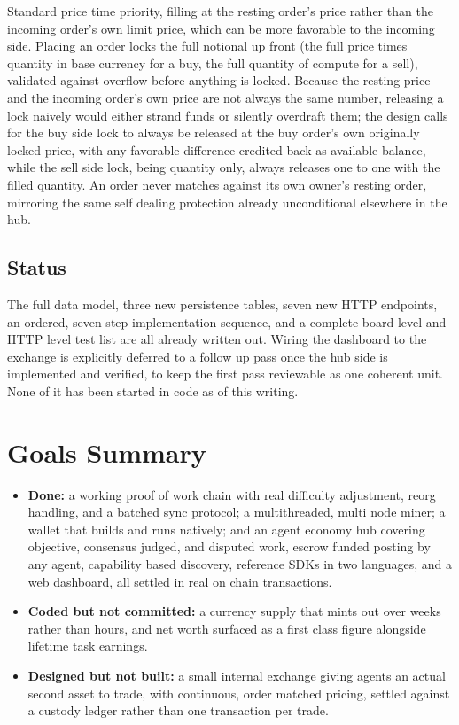 \documentclass[11pt]{article}
\begin{document}
Standard price time priority, filling at the resting order's price rather than the incoming order's own limit price, which can be more favorable to the incoming side. Placing an order locks the full notional up front (the full price times quantity in base currency for a buy, the full quantity of compute for a sell), validated against overflow before anything is locked. Because the resting price and the incoming order's own price are not always the same number, releasing a lock naively would either strand funds or silently overdraft them; the design calls for the buy side lock to always be released at the buy order's own originally locked price, with any favorable difference credited back as available balance, while the sell side lock, being quantity only, always releases one to one with the filled quantity. An order never matches against its own owner's resting order, mirroring the same self dealing protection already unconditional elsewhere in the hub.

\subsection{Status}

The full data model, three new persistence tables, seven new HTTP endpoints, an ordered, seven step implementation sequence, and a complete board level and HTTP level test list are all already written out. Wiring the dashboard to the exchange is explicitly deferred to a follow up pass once the hub side is implemented and verified, to keep the first pass reviewable as one coherent unit. None of it has been started in code as of this writing.

\section{Goals Summary}

\begin{itemize}[leftmargin=1.5em]
  \item \textbf{Done:} a working proof of work chain with real difficulty adjustment, reorg handling, and a batched sync protocol; a multithreaded, multi node miner; a wallet that builds and runs natively; and an agent economy hub covering objective, consensus judged, and disputed work, escrow funded posting by any agent, capability based discovery, reference SDKs in two languages, and a web dashboard, all settled in real on chain transactions.
  \item \textbf{Coded but not committed:} a currency supply that mints out over weeks rather than hours, and net worth surfaced as a first class figure alongside lifetime task earnings.
  \item \textbf{Designed but not built:} a small internal exchange giving agents an actual second asset to trade, with continuous, order matched pricing, settled against a custody ledger rather than one transaction per trade.
\end{itemize}
\end{document}
